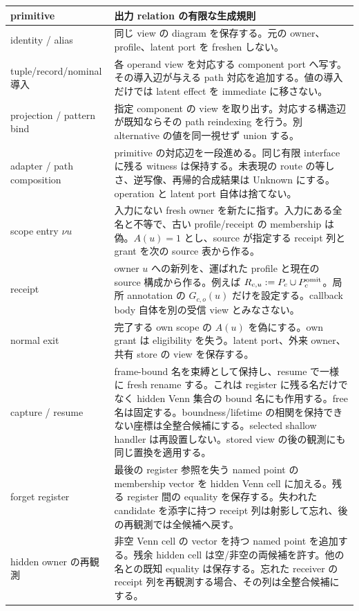 \documentclass[11pt,a4paper]{article}
\theoremstyle{remark}
\begin{document}
\begin{longtable}{p{}p{}}
\toprule
primitive & 出力 relation の有限な生成規則 \\
\midrule\endhead
identity / alias & 同じ view の diagram を保存する。元の owner、profile、latent port を freshen しない。\\
tuple/record/nominal 導入 & 各 operand view を対応する component port へ写す。その導入辺が与える path 対応を追加する。値の導入だけでは latent effect を immediate に移さない。\\
projection / pattern bind & 指定 component の view を取り出す。対応する構造辺が既知ならその path reindexing を行う。別 alternative の値を同一視せず union する。\\
adapter / path composition & primitive の対応辺を一段進める。同じ有限 interface に残る witness は保持する。未表現の route の等しさ、逆写像、再帰的合成結果は Unknown にする。operation と latent port 自体は捨てない。\\
scope entry $\nu u$ & 入力にない fresh owner を新たに指す。入力にある全名と不等で、古い profile/receipt の membership は偽。$A(u)=1$ とし、source が指定する receipt 列と grant を次の source 表から作る。\\
receipt & owner $u$ への新列を、運ばれた profile と現在の source 構成から作る。例えば $R_{c,u}:=P_c\cup P^{\rm omit}_c$。局所 annotation の $G_{c,o}(u)$ だけを設定する。callback body 自体を別の受信 view とみなさない。\\
normal exit & 完了する own scope の $A(u)$ を偽にする。own grant は eligibility を失う。latent port、外来 owner、共有 store の view を保存する。\\
capture / resume & frame-bound 名を束縛として保持し、resume で一様に fresh rename する。これは register に残る名だけでなく hidden Venn 集合の bound 名にも作用する。free 名は固定する。boundness/lifetime の相関を保持できない座標は全整合候補にする。selected shallow handler は再設置しない。stored view の後の観測にも同じ置換を適用する。\\
forget register & 最後の register 参照を失う named point の membership vector を hidden Venn cell に加える。残る register 間の equality を保存する。失われた candidate を添字に持つ receipt 列は射影して忘れ、後の再観測では全候補へ戻す。\\
hidden owner の再観測 & 非空 Venn cell の vector を持つ named point を追加する。残余 hidden cell は空/非空の両候補を許す。他の名との既知 equality は保存する。忘れた receiver の receipt 列を再観測する場合、その列は全整合候補にする。\\

\end{longtable}
\end{document}
